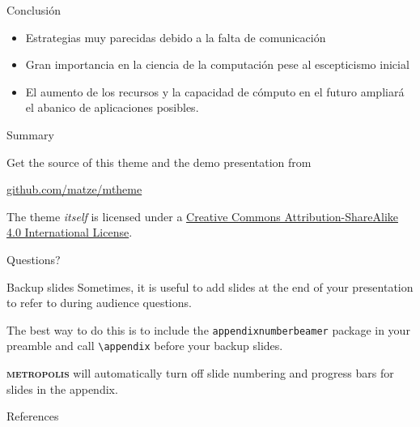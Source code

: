 \documentclass[10pt]{beamer}
\newcommand{\themename}{\textbf{\textsc{metropolis}}\xspace}
\begin{document}
\begin{frame}{Conclusión}

 \begin{itemize}\itemsep2pt
  \item Estrategias muy parecidas debido a la falta de comunicación
  \item Gran importancia en la ciencia de la computación pese al escepticismo inicial
  \item El aumento de los recursos y la capacidad de cómputo en el futuro ampliará el abanico de aplicaciones posibles.
  \end{itemize}

  
\end{frame}

\begin{frame}{Summary}

  Get the source of this theme and the demo presentation from

  \begin{center}\url{github.com/matze/mtheme}\end{center}

  The theme \emph{itself} is licensed under a
  \href{http://creativecommons.org/licenses/by-sa/4.0/}{Creative Commons
  Attribution-ShareAlike 4.0 International License}.

  \begin{center}\ccbysa\end{center}

\end{frame}

\begin{frame}[standout]
  Questions?
\end{frame}

\appendix

\begin{frame}[fragile]{Backup slides}
  Sometimes, it is useful to add slides at the end of your presentation to
  refer to during audience questions.

  The best way to do this is to include the \verb|appendixnumberbeamer|
  package in your preamble and call \verb|\appendix| before your backup slides.

  \themename will automatically turn off slide numbering and progress bars for
  slides in the appendix.
\end{frame}

\begin{frame}[allowframebreaks]{References}

  
  

\end{frame}
\end{document}
